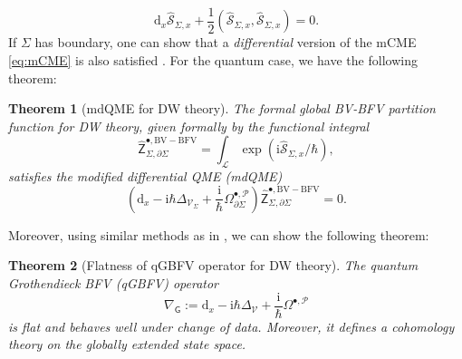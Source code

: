 \documentclass[11pt,colorinlistoftodos]{amsart}
\numberwithin{equation}{subsection}
\theoremstyle{plain}
\newtheorem{thm}{Theorem}[subsection]
\theoremstyle{definition}
\theoremstyle{remark}
\newcommand{\dd}{{\mathrm{d}}}
\newcommand{\de}{\partial}
\newcommand{\calS}{\mathcal{S}}
\newcommand{\calL}{\mathcal{L}}
\newcommand{\calP}{\mathcal{P}}
\newcommand{\I}{\mathrm{i}}
\newcommand{\calV}{\mathcal{V}}
\begin{document}
\begin{equation}
    \label{eq:dCME}
    \dd_x\widehat{\calS}_{\Sigma,x}+\frac{1}{2}(\widehat{\calS}_{\Sigma,x},\widehat{\calS}_{\Sigma,x})=0.
\end{equation}
If $\Sigma$ has boundary, one can show that a \emph{differential} version of the mCME \eqref{eq:mCME} is also satisfied \cite{CMW4}. For the quantum case, we have the following theorem: 
\begin{thm}[mdQME for DW theory]\label{thm:mdQME}
The formal global BV-BFV partition function for DW theory, given formally by the functional integral
\[
\widehat{\mathsf{Z}}^{\bullet,\scriptscriptstyle\mathrm{BV-BFV}}_{\Sigma,\de\Sigma}=\int_{\calL}\exp(\I\widehat{\calS}_{\Sigma,x}/\hbar),
\]
satisfies the \emph{modified differential QME} (mdQME) 
\begin{equation}
    \label{eq:mdQME}
    \left(\dd_x-\I\hbar\Delta_{\calV_\Sigma}+\frac{\I}{\hbar}\Omega^{\bullet,\calP}_{\de\Sigma}\right)\widehat{\mathsf{Z}}^{\bullet,\scriptscriptstyle\mathrm{BV-BFV}}_{\Sigma,\de\Sigma}=0.
\end{equation}
\end{thm}

Moreover, using similar methods as in \cite{CMW4}, we can show the following theorem:

\begin{thm}[Flatness of qGBFV operator for DW theory]\label{thm:flat_Grothendieck}
The \emph{quantum Grothendieck BFV (qGBFV) operator}
\[
\nabla_\mathsf{G}:=\dd_x-\I\hbar\Delta_{\calV}+\frac{\I}{\hbar}\Omega^{\bullet,\calP}
\]
is flat and behaves well under change of data. Moreover, it defines a cohomology theory on the globally extended state space.
\end{thm}
\end{document}
